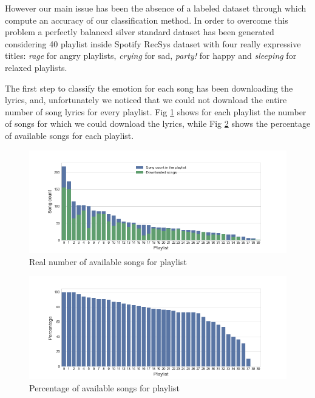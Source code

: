 However our main issue has been the absence of a labeled dataset through which compute an accuracy of our classification method. In order to overcome this problem a perfectly balanced silver standard dataset has been generated considering 40 playlist inside Spotify RecSys dataset with four really expressive titles: \textit{rage} for angry playlists, \textit{crying} for sad, \textit{party!} for happy and \textit{sleeping} for relaxed playlists. \par

The first step to classify the emotion for each song has been downloading the lyrics, and, unfortunately we noticed that we could not download the entire number of song lyrics for every playlist. Fig \ref{fig:rsongs} shows for each playlist the number of songs for which we could download the lyrics, while Fig \ref{fig:psongs} shows the percentage of available songs for each playlist. 

\begin{figure}[H]
\centering
\includegraphics[width=1\textwidth]{./chapters/chapter5/images/silver_standard_available_songs.png}
\caption{Real number of available songs for playlist}
\label{fig:rsongs}
\end{figure}

\begin{figure}[H]
\centering
\includegraphics[width=1\textwidth]{./chapters/chapter5/images/silver_standard_percentage_available_songs.png}
\caption{Percentage of available songs for playlist}
\label{fig:psongs}
\end{figure}

